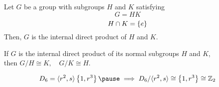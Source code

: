 
\begin{frame}
  \begin{definition}
	Let $G$ be a group with  subgroups $H$ and $K$ satisfying
	\[
	  G = HK
	\]
	\[
	  H \cap K = \left\{e\right\}
	\]
	Then, $G$ is the internal direct product of $H$ and $K$.
  \end{definition}


\end{frame}

\begin{frame}
  \begin{theorem}
	\begin{center}
	  If $G$ is the internal direct product of its normal subgroups $H$ and $K$, \\[5pt]
	  then $G/H \cong K, \quad G/K \cong H$.	
	\end{center}
  \end{theorem}

  \pause
  \[
	D_6 = \langle r^2, s \rangle \set{1, r^3} \pause \implies D_6/\langle r^2, s \rangle \cong \set{1, r^3} \cong \z_{2}
  \]


\end{frame}
